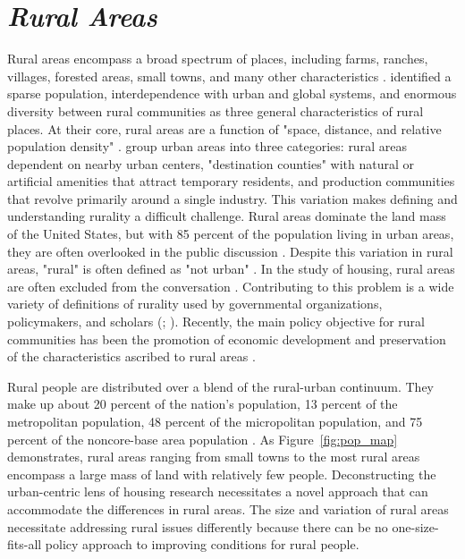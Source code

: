  

\section{\textit{Rural Areas}} 

Rural areas encompass a broad spectrum of places, including farms, ranches, villages, forested areas, small towns, and many other characteristics \citep{cromartie_defining_2008}. \citet{castle_conceptual_1998} identified a sparse population, interdependence with urban and global systems, and enormous diversity between rural communities as three general characteristics of rural places. At their core, rural areas are a function of "space, distance, and relative population density" \citep{castle_place_2011}. \citet{shoup_principles_2010} group urban areas into three categories: rural areas dependent on nearby urban centers, "destination counties" with natural or artificial amenities that attract temporary residents, and production communities that revolve primarily around a single industry. This variation makes defining and understanding rurality a difficult challenge. Rural areas dominate the land mass of the United States, but with 85 percent of the population living in urban areas, they are often overlooked in the public discussion \citep{pendall_future_2016}. Despite this variation in rural areas, "rural" is often defined as "not urban" \citep{national_coalition_for_the_homeless_rural_2009}. In the study of housing, rural areas are often excluded from the conversation \citep{gkartzios_housing_2017}. Contributing to this problem is a wide variety of definitions of rurality used by governmental organizations, policymakers, and scholars (\citealp{yousey_defining_2018}; \citealp{cromartie_defining_2008}). Recently, the main policy objective for rural communities has been the promotion of economic development and preservation of the characteristics ascribed to rural areas \citep{lichter_changing_2007}.  

 

Rural people are distributed over a blend of the rural-urban continuum. They make up about 20 percent of the nation's population, 13 percent of the metropolitan population, 48 percent of the micropolitan population, and 75 percent of the noncore-base area population \citep{isserman_national_2005}. As Figure~\ref{fig:pop_map} demonstrates, rural areas ranging from small towns to the most rural areas encompass a large mass of land with relatively few people. Deconstructing the urban-centric lens of housing research necessitates a novel approach that can accommodate the differences in rural areas. The size and variation of rural areas necessitate addressing rural issues differently because there can be no one-size-fits-all policy approach to improving conditions for rural people.  

